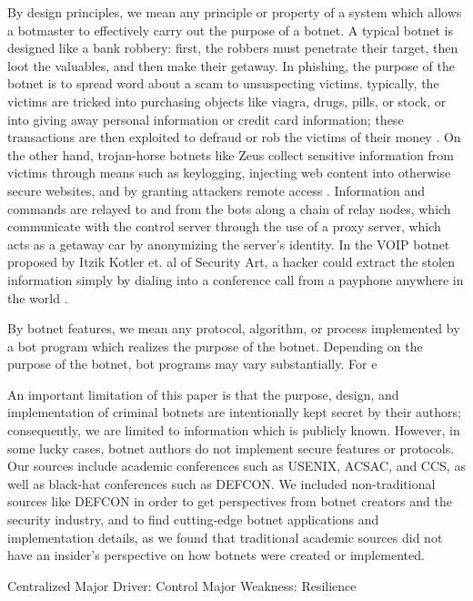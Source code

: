 \documentclass{acm_proc_article-sp}
\begin{document}
By design principles, we mean any principle or property of a system which allows a botmaster to effectively carry out the purpose of a botnet.  A typical botnet is designed like a bank robbery: first, the robbers must penetrate their target, then loot the valuables, and then make their getaway. In phishing, the purpose of the botnet is to spread word about a scam to unsuspecting victims. typically, the victims are tricked into purchasing objects like viagra, drugs, pills, or stock, or into giving away personal information or credit card information; these transactions are then exploited to defraud or rob the victims of their money
\cite{defcon:javascript}
\cite{defcon:spam}
\cite{wikipedia:phishing}.  On the other hand, trojan-horse botnets like Zeus collect sensitive information from victims through means such as keylogging, injecting web content into otherwise secure websites, and by granting attackers remote access \cite{defcon:javascript}
\cite{blackhat:zeus}
\cite{defcon:spam}
\cite{wikipedia:trojan}. Information and commands are relayed to and from the bots along a chain of relay nodes, which communicate with the control server through the use of a proxy server, which acts as a getaway car by anonymizing the server's identity.  In the VOIP botnet proposed by Itzik Kotler et. al of Security Art, a hacker could extract the stolen information simply by dialing into a conference call from a payphone anywhere in the world \cite{defcon:voip}.

By botnet features, we mean any protocol, algorithm, or process implemented by a bot program which realizes the purpose of the botnet.  Depending on the purpose of the botnet, bot programs may vary substantially.  For e

An important limitation of this paper is that the purpose, design, and implementation of criminal botnets are intentionally kept secret by their authors; consequently, we are limited to information which is publicly known. However, in some lucky cases, botnet authors do not implement secure features or protocols. Our sources include academic conferences such as USENIX, ACSAC,  and CCS, as well as black-hat conferences such as DEFCON.  We included non-traditional sources like DEFCON in order to get perspectives from botnet creators and the security industry, and to find cutting-edge botnet applications and implementation details, as we found that traditional academic sources did not have an insider's perspective on how botnets were created or implemented.

Centralized
Major Driver: Control
Major Weakness: Resilience
\end{document}

